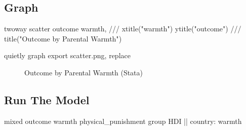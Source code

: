 \documentclass[
  letterpaper,
  DIV=11,
  numbers=noendperiod]{scrreprt}
\newenvironment{Shaded}{\begin{snugshade}}{\end{snugshade}}
\newcommand{\BaseNTok}[1]{\textcolor[rgb]{0.68,0.00,0.00}{#1}}
\newcommand{\CommentTok}[1]{\textcolor[rgb]{0.37,0.37,0.37}{#1}}
\newcommand{\FunctionTok}[1]{\textcolor[rgb]{0.28,0.35,0.67}{#1}}
\newcommand{\KeywordTok}[1]{\textcolor[rgb]{0.00,0.23,0.31}{#1}}
\newcommand{\NormalTok}[1]{\textcolor[rgb]{0.00,0.23,0.31}{#1}}
\newcommand{\StringTok}[1]{\textcolor[rgb]{0.13,0.47,0.30}{#1}}
\begin{document}
\subsection{Graph}\label{graph}

\begin{Shaded}
\begin{Highlighting}[]
\KeywordTok{twoway} \KeywordTok{scatter}\NormalTok{ outcome warmth, }\CommentTok{///}
  \BaseNTok{xtitle}\NormalTok{(}\StringTok{"warmth"}\NormalTok{) }\BaseNTok{ytitle}\NormalTok{(}\StringTok{"outcome"}\NormalTok{) }\CommentTok{///}
  \BaseNTok{title}\NormalTok{(}\StringTok{"Outcome by Parental Warmth"}\NormalTok{) }

\KeywordTok{quietly} \KeywordTok{graph} \KeywordTok{export} \KeywordTok{scatter}\NormalTok{.png, }\KeywordTok{replace}
\end{Highlighting}
\end{Shaded}

\begin{figure}


\caption{\label{fig-Stata}Outcome by Parental Warmth (Stata)}

\end{figure}%

\subsection{Run The Model}\label{run-the-model}

\begin{Shaded}
\begin{Highlighting}[]

\NormalTok{mixed outcome warmth physical\_punishment }\FunctionTok{group}\NormalTok{ HDI || country: warmth}
\end{Highlighting}
\end{Shaded}
\end{document}
